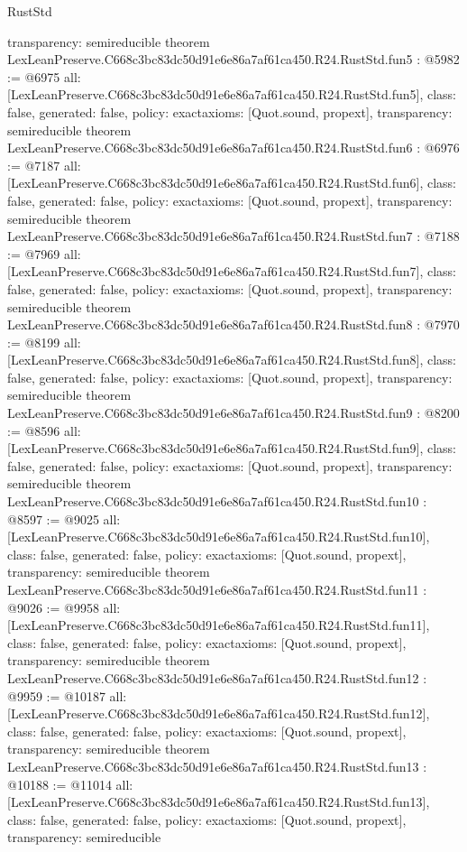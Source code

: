 \begin{lexlean}{RustStd}
\begin{coremodule}
{  transparency: semireducible
}
theorem LexLeanPreserve.C668c3bc83dc50d91e6e86a7af61ca450.R24.RustStd.fun5 : @5982 := @6975 {
  all: [LexLeanPreserve.C668c3bc83dc50d91e6e86a7af61ca450.R24.RustStd.fun5],
  class: false,
  generated: false,
  policy: exact{axioms: [Quot.sound, propext]},
  transparency: semireducible
}
theorem LexLeanPreserve.C668c3bc83dc50d91e6e86a7af61ca450.R24.RustStd.fun6 : @6976 := @7187 {
  all: [LexLeanPreserve.C668c3bc83dc50d91e6e86a7af61ca450.R24.RustStd.fun6],
  class: false,
  generated: false,
  policy: exact{axioms: [Quot.sound, propext]},
  transparency: semireducible
}
theorem LexLeanPreserve.C668c3bc83dc50d91e6e86a7af61ca450.R24.RustStd.fun7 : @7188 := @7969 {
  all: [LexLeanPreserve.C668c3bc83dc50d91e6e86a7af61ca450.R24.RustStd.fun7],
  class: false,
  generated: false,
  policy: exact{axioms: [Quot.sound, propext]},
  transparency: semireducible
}
theorem LexLeanPreserve.C668c3bc83dc50d91e6e86a7af61ca450.R24.RustStd.fun8 : @7970 := @8199 {
  all: [LexLeanPreserve.C668c3bc83dc50d91e6e86a7af61ca450.R24.RustStd.fun8],
  class: false,
  generated: false,
  policy: exact{axioms: [Quot.sound, propext]},
  transparency: semireducible
}
theorem LexLeanPreserve.C668c3bc83dc50d91e6e86a7af61ca450.R24.RustStd.fun9 : @8200 := @8596 {
  all: [LexLeanPreserve.C668c3bc83dc50d91e6e86a7af61ca450.R24.RustStd.fun9],
  class: false,
  generated: false,
  policy: exact{axioms: [Quot.sound, propext]},
  transparency: semireducible
}
theorem LexLeanPreserve.C668c3bc83dc50d91e6e86a7af61ca450.R24.RustStd.fun10 : @8597 := @9025 {
  all: [LexLeanPreserve.C668c3bc83dc50d91e6e86a7af61ca450.R24.RustStd.fun10],
  class: false,
  generated: false,
  policy: exact{axioms: [Quot.sound, propext]},
  transparency: semireducible
}
theorem LexLeanPreserve.C668c3bc83dc50d91e6e86a7af61ca450.R24.RustStd.fun11 : @9026 := @9958 {
  all: [LexLeanPreserve.C668c3bc83dc50d91e6e86a7af61ca450.R24.RustStd.fun11],
  class: false,
  generated: false,
  policy: exact{axioms: [Quot.sound, propext]},
  transparency: semireducible
}
theorem LexLeanPreserve.C668c3bc83dc50d91e6e86a7af61ca450.R24.RustStd.fun12 : @9959 := @10187 {
  all: [LexLeanPreserve.C668c3bc83dc50d91e6e86a7af61ca450.R24.RustStd.fun12],
  class: false,
  generated: false,
  policy: exact{axioms: [Quot.sound, propext]},
  transparency: semireducible
}
theorem LexLeanPreserve.C668c3bc83dc50d91e6e86a7af61ca450.R24.RustStd.fun13 : @10188 := @11014 {
  all: [LexLeanPreserve.C668c3bc83dc50d91e6e86a7af61ca450.R24.RustStd.fun13],
  class: false,
  generated: false,
  policy: exact{axioms: [Quot.sound, propext]},
  transparency: semireducible
}
\end{coremodule}
\end{lexlean}
